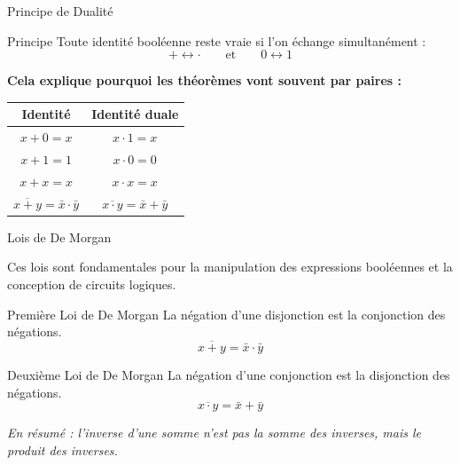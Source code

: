 \begin{frame}{Principe de Dualité}

    \begin{alertblock}{Principe}
        Toute identité booléenne reste vraie si l'on échange simultanément :
        \[
            + \longleftrightarrow \cdot \qquad \text{et} \qquad 0 \longleftrightarrow 1
        \]
    \end{alertblock}

    \vspace{0.4cm}

    \textbf{Cela explique pourquoi les théorèmes vont souvent par paires :}

    \vspace{0.3cm}

    \centering
    \begin{tabular}{|c|c|}
        \hline
        \textbf{Identité} & \textbf{Identité duale} \\
        \hline
        \(x + 0 = x\) & \(x \cdot 1 = x\) \\
        \(x + 1 = 1\) & \(x \cdot 0 = 0\) \\
        \(x + x = x\) & \(x \cdot x = x\) \\
        \(\overline{x + y} = \bar{x} \cdot \bar{y}\) & \(\overline{x \cdot y} = \bar{x} + \bar{y}\) \\
        \hline
    \end{tabular}

\end{frame}

\begin{frame}{Lois de De Morgan}

    Ces lois sont fondamentales pour la manipulation des expressions booléennes et la conception de circuits logiques.

    \vspace{0.4cm}

    \begin{alertblock}{Première Loi de De Morgan}
        La négation d'une disjonction est la conjonction des négations.
        \[
            \overline{x + y} = \bar{x} \cdot \bar{y}
        \]
    \end{alertblock}

    \vspace{0.2cm}

    \begin{alertblock}{Deuxième Loi de De Morgan}
        La négation d'une conjonction est la disjonction des négations.
        \[
            \overline{x \cdot y} = \bar{x} + \bar{y}
        \]
    \end{alertblock}

    \vspace{0.2cm}
    \centering
    \textit{En résumé : l'inverse d'une somme n'est pas la somme des inverses, mais le produit des inverses.}

\end{frame}
